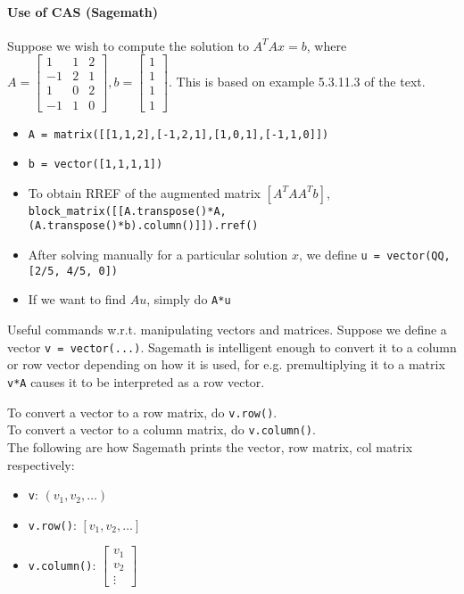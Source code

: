 \documentclass{article}
\newcommand*\colVector[1]{\begin{bmatrix}#1\end{bmatrix}}
\begin{document}
\paragraph{Use of CAS (Sagemath)} Suppose we wish to compute the solution to $A^TAx = b$, where $A = \begin{bmatrix}
	1 & 1 & 2\\
	-1 & 2 & 1\\
	1 & 0 & 2\\
	-1 & 1 & 0
\end{bmatrix}, b = \colVector{1\\1\\1\\1}$. This is based on example 5.3.11.3 of the text.

\begin{itemize}
	\item \texttt{A = matrix([[1,1,2],[-1,2,1],[1,0,1],[-1,1,0]])}
	\item \texttt{b = vector([1,1,1,1])}
	\item To obtain RREF of the augmented matrix $[A^TA A^Tb]$, \texttt{block\_matrix([[A.transpose()*A, (A.transpose()*b).column()]]).rref()}
	\item After solving manually for a particular solution $x$, we define \texttt{u = vector(QQ, [2/5, 4/5, 0])}
	\item If we want to find $Au$, simply do \texttt{A*u}
\end{itemize}

Useful commands w.r.t. manipulating vectors and matrices.
Suppose we define a vector \texttt{v = vector(...)}. Sagemath is intelligent enough to convert it to a column or row vector depending on how it is used, for e.g. premultiplying it to a matrix \texttt{v*A} causes it to be interpreted as a row vector.

To convert a vector to a row matrix, do \texttt{v.row()}.\\
To convert a vector to a column matrix, do \texttt{v.column()}.\\
The following are how Sagemath prints the vector, row matrix, col matrix respectively:
\begin{itemize}
	\item \texttt{v}: $(v_1,v_2,\dots)$
	\item \texttt{v.row()}: $[v_1,v_2,\dots]$
	\item \texttt{v.column()}: $\colVector{v_1\\v_2\\ \vdots}$
\end{itemize}
\end{document}
